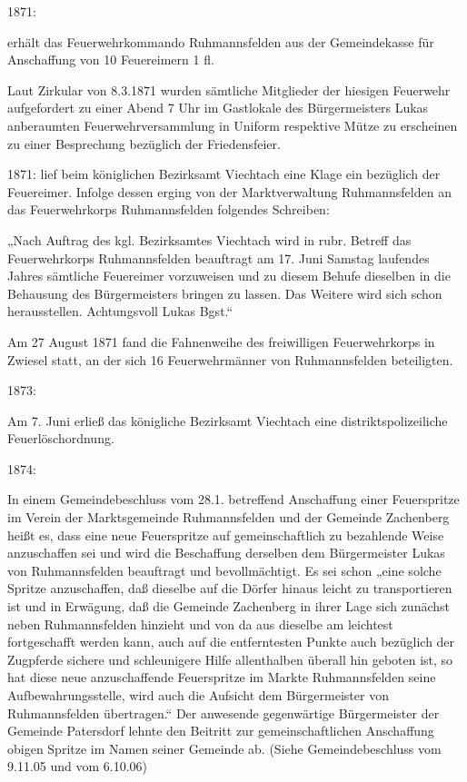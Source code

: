 \documentclass{book}
\begin{document}
1871:

erhält das Feuerwehrkommando Ruhmannsfelden aus der Gemeindekasse für
Anschaffung von 10 Feuereimern 1 fl.

    Laut Zirkular von 8.3.1871 wurden sämtliche Mitglieder der hiesigen
    Feuerwehr aufgefordert zu einer Abend 7 Uhr im Gastlokale des Bürgermeisters
    Lukas anberaumten Feuerwehrversammlung in Uniform respektive Mütze zu
    erscheinen zu einer Besprechung bezüglich der Friedensfeier.

1871:   lief beim königlichen Bezirksamt Viechtach eine Klage ein bezüglich der
Feuereimer. Infolge dessen erging von der Marktverwaltung Ruhmannsfelden an das
Feuerwehrkorps Ruhmannsfelden folgendes Schreiben:

„Nach Auftrag des kgl. Bezirksamtes Viechtach wird in rubr. Betreff das
Feuerwehrkorps Ruhmannsfelden beauftragt am 17. Juni Samstag laufendes Jahres
sämtliche Feuereimer vorzuweisen und zu diesem Behufe dieselben in die Behausung
des Bürgermeisters bringen zu lassen. Das Weitere wird sich schon herausstellen.
Achtungsvoll Lukas Bgst.“

Am 27 August 1871 fand die Fahnenweihe des freiwilligen Feuerwehrkorps in
Zwiesel statt, an der sich 16 Feuerwehrmänner von Ruhmannsfelden beteiligten.

1873:

Am 7. Juni erließ das königliche Bezirksamt Viechtach eine distriktspolizeiliche
Feuerlöschordnung.

1874:

In einem Gemeindebeschluss vom 28.1. betreffend Anschaffung einer Feuerspritze
im Verein der Marktsgemeinde Ruhmannsfelden und der Gemeinde Zachenberg heißt
es, dass eine neue Feuerspritze auf gemeinschaftlich zu bezahlende Weise
anzuschaffen sei und wird die Beschaffung derselben dem Bürgermeister Lukas von
Ruhmannsfelden beauftragt und bevollmächtigt. Es sei schon „eine solche Spritze
anzuschaffen, daß dieselbe auf die Dörfer hinaus leicht zu transportieren ist
und in Erwägung, daß die Gemeinde Zachenberg in ihrer Lage sich zunächst neben
Ruhmannsfelden hinzieht und von da aus dieselbe am leichtest fortgeschafft
werden kann, auch auf die entferntesten Punkte auch bezüglich der Zugpferde
sichere und schleunigere Hilfe allenthalben überall hin geboten ist, so hat
diese neue anzuschaffende Feuerspritze im Markte Ruhmannsfelden seine
Aufbewahrungsstelle, wird auch die Aufsicht dem Bürgermeister von Ruhmannsfelden
übertragen.“ Der anwesende gegenwärtige Bürgermeister der Gemeinde Patersdorf
lehnte den Beitritt zur gemeinschaftlichen Anschaffung obigen Spritze im Namen
seiner Gemeinde ab. (Siehe Gemeindebeschluss vom 9.11.05 und vom 6.10.06)
\end{document}
